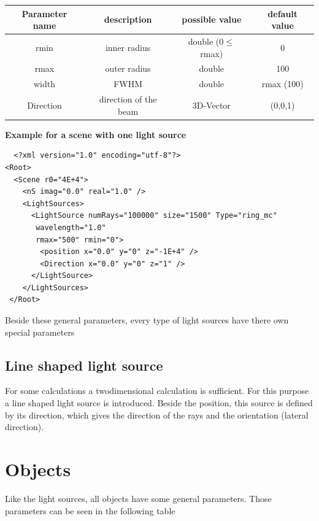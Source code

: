 \documentclass[a4paper,html,11pt,openany]{book}
\begin{document}
\vspace{1em}
 \begin{tabular}{c|c|c|c}
 Parameter name & description  & possible value & default value\\
 \hline
 rmin  & inner radius & double ($0\le$ rmax) & 0 \\
 \hline 
 rmax & outer radius & double & 100 \\
 \hline 
 width & FWHM & double & rmax (100) \\
 \hline
 Direction & direction of the beam & 3D-Vector & (0,0,1) \\ 
\end{tabular}
 
\vspace{1em} 
 \textbf{Example for a scene with one light source}
 \lstset{language=XML}
 \begin{lstlisting}
  <?xml version="1.0" encoding="utf-8"?>
<Root>
  <Scene r0="4E+4">
    <nS imag="0.0" real="1.0" />
    <LightSources>
      <LightSource numRays="100000" size="1500" Type="ring_mc"
       wavelength="1.0"
       rmax="500" rmin="0">
        <position x="0.0" y="0" z="-1E+4" />
        <Direction x="0.0" y="0" z="1" />
      </LightSource>
    </LightSources>
 </Root>
 \end{lstlisting}
 Beside these general parameters, every type of light sources have there own special parameters

\subsection{Line shaped light source}
For some calculations a twodimensional calculation is sufficient. For this purpose a line shaped light source is introduced. Beside the position, this source is defined by its direction, which gives the direction of the rays and the orientation (lateral direction). 

 \section{Objects}
 Like the light sources, all objects have some general parameters. Those parameters can be seen in the following table
 
\end{document}
